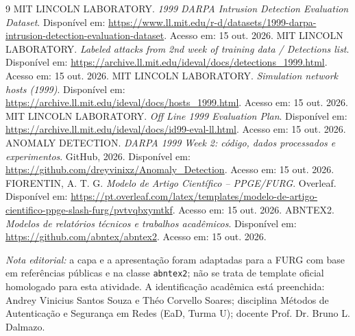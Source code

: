 \documentclass[12pt,oneside,a4paper,brazil]{abntex2}
\begin{document}
\begin{thebibliography}{9}
 MIT LINCOLN LABORATORY. \textit{1999 DARPA Intrusion Detection Evaluation Dataset}. Disponível em: \url{https://www.ll.mit.edu/r-d/datasets/1999-darpa-intrusion-detection-evaluation-dataset}. Acesso em: 15 out. 2026.
 MIT LINCOLN LABORATORY. \textit{Labeled attacks from 2nd week of training data / Detections list}. Disponível em: \url{https://archive.ll.mit.edu/ideval/docs/detections_1999.html}. Acesso em: 15 out. 2026.
 MIT LINCOLN LABORATORY. \textit{Simulation network hosts (1999)}. Disponível em: \url{https://archive.ll.mit.edu/ideval/docs/hosts_1999.html}. Acesso em: 15 out. 2026.
 MIT LINCOLN LABORATORY. \textit{Off Line 1999 Evaluation Plan}. Disponível em: \url{https://archive.ll.mit.edu/ideval/docs/id99-eval-ll.html}. Acesso em: 15 out. 2026.
 ANOMALY DETECTION. \textit{DARPA 1999 Week 2: código, dados processados e experimentos}. GitHub, 2026. Disponível em: \url{https://github.com/dreyvinixz/Anomaly_Detection}. Acesso em: 15 out. 2026.
 FIORENTIN, A. T. G. \textit{Modelo de Artigo Científico -- PPGE/FURG}. Overleaf. Disponível em: \url{https://pt.overleaf.com/latex/templates/modelo-de-artigo-cientifico-ppge-slash-furg/pvtvqbxymtkf}. Acesso em: 15 out. 2026.
 ABNTEX2. \textit{Modelos de relatórios técnicos e trabalhos acadêmicos}. Disponível em: \url{https://github.com/abntex/abntex2}. Acesso em: 15 out. 2026.
\end{thebibliography}
\vspace{1cm}
\noindent\textit{Nota editorial:} a capa e a apresentação foram adaptadas para a FURG com base em referências públicas e na classe \texttt{abntex2}; não se trata de template oficial homologado para esta atividade. A identificação acadêmica está preenchida: Andrey Vinicius Santos Souza e Théo Corvello Soares; disciplina Métodos de Autenticação e Segurança em Redes (EaD, Turma U); docente Prof. Dr. Bruno L. Dalmazo.
\end{document}
